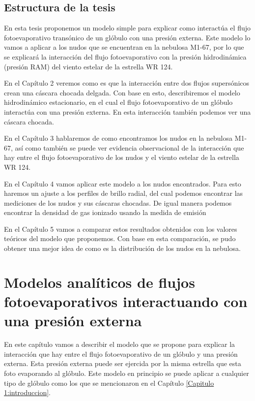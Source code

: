 \documentclass{book}
\begin{document}
\section{Estructura de la tesis}

En esta tesis proponemos un modelo simple para explicar como
interactúa el flujo fotoevaporativo transónico de un glóbulo con una
presión externa. Este modelo lo vamos a aplicar a los nudos que se
encuentran en la nebulosa M1-67, por lo que se explicará la
interacción del flujo fotoevaporativo con la presión hidrodinámica
(presión RAM) del viento estelar de la estrella WR 124.

En el Capítulo 2 veremos como es que la interacción entre dos flujos
supersónicos crean una cáscara chocada delgada. Con base en esto,
describiremos el modelo hidrodinámico estacionario, en el cual el
flujo fotoevaporativo de un glóbulo interactúa con una presión
externa. En esta interacción también podemos ver una cáscara chocada.

En el Capítulo 3 hablaremos de como encontramos los nudos en la
nebulosa M1-67, así como también se puede ver evidencia observacional
de la interacción que hay entre el flujo fotoevaporativo de los nudos
y el viento estelar de la estrella WR 124.

En el Capítulo 4 vamos aplicar este modelo a los nudos encontrados.
Para esto haremos un ajuste a los perfiles de brillo radial, del cual
podemos encontrar las mediciones de los nudos y sus cáscaras chocadas.
De igual manera podemos encontrar la densidad de gas ionizado usando
la medida de emisión

En el Capítulo 5 vamos a comparar estos resultados obtenidos con los
valores teóricos del modelo que proponemos. Con base en esta
comparación, se pudo obtener una mejor idea de como es la distribución
de los nudos en la nebulosa.

\chapter{Modelos analíticos de flujos fotoevaporativos interactuando
  con una presión externa}
\label{Chapter : Modelo}

En este capítulo vamos a describir el modelo que se propone para
explicar la interacción que hay entre el flujo fotoevaporativo de un
glóbulo y una presión externa. Esta presión externa puede ser ejercida
por la misma estrella que esta foto evaporando al glóbulo. Este modelo
en principio se puede aplicar a cualquier tipo de glóbulo como los que
se mencionaron en el Capítulo \ref{Capitulo 1:introduccion}.
\end{document}
